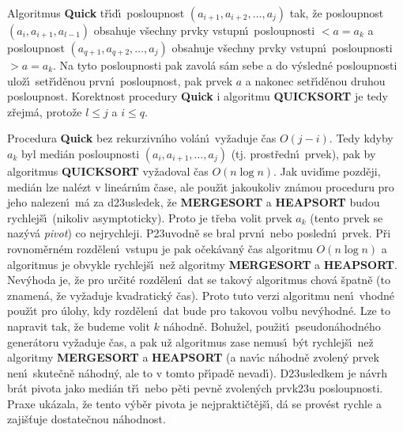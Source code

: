 \flushpar Algoritmus {\bf Quick} t\v r\'\i d\'\i\ posloupnost 
$\left(a_{i+1},a_{i+2},\dots,a_j\right)$ tak, \v ze posloupnost $\left(a_i,a_{i+1}
,a_{l-1}\right)$ obsahuje v\v sechny prvky vstupn\'\i\ posloupnosti $<a=a_k$ a  
posloupnost $\left(a_{q+1},a_{q+2},\dots,a_j\right)$ obsahuje v\v sechny prvky 
vstupn\'\i\ posloupnosti $>a=a_k$. Na tyto posloupnosti pak 
zavol\'a s\'am sebe a do v\'ysledn\'e posloupnosti ulo\v z\'\i\ 
set\v r\'\i d\v enou prvn\'\i\ posloupnost, pak prvek $a$ a nakonec 
set\v r\'\i d\v enou druhou posloupnost. Korektnost procedury 
{\bf Quick}  i algoritmu {\bf QUICKSORT} je tedy z\v rejm\'a, proto\v ze 
$l\le j$ a $i\le q$. 
\medskip

\flushpar Procedura {\bf Quick} bez rekurzivn\'\i ho vol\'an\'\i\ 
vy\v zaduje \v cas $O\left(j-i\right)$. Tedy kdyby $a_k$ byl medi\'an 
posloupnosti $\left(a_i,a_{i+1},\dots,a_j\right)$ (tj. prost\v redn\'\i\ prvek), pak 
by algoritmus {\bf QUICKSORT} vy\-\v zadoval \v cas $O\left(n\log n\right)$. Jak 
uvid\'\i me pozd\v eji, medi\'an lze nal\'ezt v line\'ar\-n\'\i m \v case, ale 
pou\v z\'\i t jakoukoliv zn\'amou proceduru pro jeho nalezen\'\i\ m\'a za 
d\accent23usledek, \v ze {\bf MERGESORT} a {\bf HEAPSORT }
budou rychlej\v s\'\i\ (nikoliv asymptoticky). Proto je t\v reba 
volit prvek $a_k$ (tento prvek se naz\'yv\'a \emph{pivot}) co 
nejrychleji. P\accent23uvodn\v e se bral prvn\'\i\ nebo 
posledn\'\i\ prvek. P\v ri rovnom\v ern\'em rozd\v elen\'\i\ vstupu je 
pak o\v cek\'avan\'y \v cas algoritmu $O\left(n\log n\right)$ a algoritmus je 
obvykle rychlej\v s\'\i\ ne\v z algoritmy {\bf MERGESORT} a 
{\bf HEAPSORT}. Nev\'yhoda je, \v ze pro ur\v cit\'e rozd\v elen\'\i\ dat se 
takov\'y algoritmus chov\'a \v spatn\v e (to znamen\'a, \v ze 
vy\v zaduje kvadra\-tick\'y \v cas). Proto tuto 
verzi algoritmu nen\'\i\ vhodn\'e pou\v z\'\i t pro \'ulohy, kdy 
rozd\v elen\'\i\ dat bude pro takovou volbu nev\'yhodn\'e. 
Lze to napravit tak, \v ze budeme volit $k$ n\'ahodn\v e. Bohu\v zel, 
pou\v zit\'\i\ pseudon\'ahodn\'eho gener\'atoru vy\v zaduje \v cas, a pak 
u\v z algoritmus zase nemus\'\i\ b\'yt rychlej\v s\'\i\ ne\v z algoritmy 
{\bf MERGESORT} a {\bf HEAPSORT} (a nav\'\i c n\'ahodn\v e zvolen\'y 
prvek nen\'\i\ skute\v cn\v e n\'ahodn\'y, ale to v tomto p\v r\'\i pad\v e 
nevad\'\i ). D\accent23usledkem je n\'avrh br\'at pivota jako 
medi\'an t\v r\'\i\ nebo p\v eti pevn\v e zvolen\'ych prvk\accent23u 
posloupnosti. Praxe uk\'azala, \v ze tento v\'yb\v er pivota je 
nej\-prakti\v ct\v ej\v s\'\i , d\'a se prov\'est rychle a zaji\v s\v tuje 
dostate\v cnou n\'a\-hod\-nost.
\medskip

